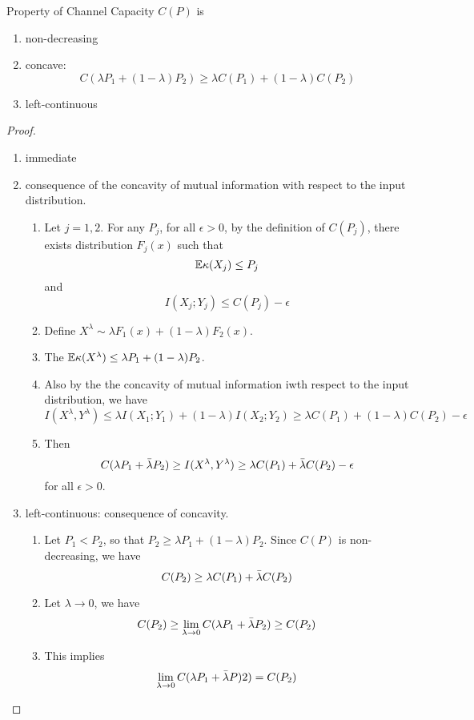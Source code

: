 \documentclass[../main.tex]{subfiles}
\begin{document}
\begin{bbox}{Property of Channel Capacity}
    $C(P)$ is \begin{enumerate}
        \item non-decreasing
        \item concave: \[
        C(\lambda P_1 + (1-\lambda)P_2)\geq \lambda C(P_1) + (1-\lambda)C(P_2)
        \]
        \item left-continuous
    \end{enumerate}
    \begin{proof}
        \begin{enumerate}
            \item immediate
            \item consequence of the concavity of mutual information with respect to the input distribution.
            \begin{enumerate}
                \item Let $j=1,2$. For any $P_j$, for all $\epsilon>0$, by the definition of $C(P_j)$, there exists distribution $F_j(x)$ such that \[
                \mathbb{E} \kappa(X_j) \leq P_j
                \] and \[
                I(X_j;Y_j)\leq C(P_j) - \epsilon
                \]
                \item Define $X^{\lambda}\sim\lambda F_1(x) + (1-\lambda) F_2(x)$.
                \item The $\mathbb{E} \kappa(X^\lambda) \leq \lambda P_1 + (1-\lambda)P_2$.
                \item Also by the the concavity of mutual information iwth respect to the input distribution, we have \[
                I(X^\lambda, Y^\lambda)\leq \lambda I(X_1;Y_1) + (1-\lambda) I(X_2;Y_2) \geq \lambda C(P_1) + (1-\lambda)C(P_2)-\epsilon
                \]
                \item Then \[
                C(\lambda P_1 +\Bar{\lambda}P_2) \geq I(X^\lambda, Y^\lambda)\geq \lambda C(P_1) + \Bar{\lambda}C(P_2)-\epsilon
                \] for all $\epsilon>0$.
            \end{enumerate}
            \item left-continuous: consequence of concavity.\begin{enumerate}
                \item Let $P_1 < P_2$, so that $P_2\geq \lambda P_1 + (1-\lambda) P_2$. Since $C(P)$ is non-decreasing, we have \[
                C(P_2)\geq \lambda C(P_1)+\Bar{\lambda}C(P_2)
                \]
                \item Let $\lambda\to 0$, we have \[
                C(P_2)\geq \lim_{\lambda\to 0}C(\lambda P_1+\Bar{\lambda}P_2) \geq C(P_2)
                \]
                \item This implies \[
                \lim_{\lambda\to 0} C(\lambda P_1+\Bar{\lambda}P)2) = C(P_2)
                \]
            \end{enumerate}
        \end{enumerate}
    \end{proof}
\end{bbox}
\end{document}
